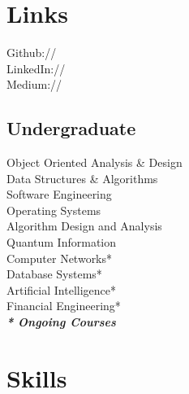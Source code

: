 \documentclass[]{deedy-resume-openfont}
\begin{document}
\begin{minipage}[t]{0.30\textwidth}

\section{Links} 
Github:// \href{https://github.com/anshulahuja98}{} \\
LinkedIn://  \href{https://www.linkedin.com/in/anshul-ahuja}{} \\
Medium://  \href{https://medium.com/@anshul.ahu/}{} \\
\href{https://scholar.google.com/citations?hl=en&user=jPd1-ygAAAAJ}{}

\sectionsep


\subsection{Undergraduate}
Object Oriented Analysis \& Design  \\
Data Structures \& Algorithms  \\
Software Engineering  \\
Operating Systems \\
Algorithm Design and Analysis \\
Quantum Information \\
Computer Networks* \\
Database Systems* \\
Artificial Intelligence* \\
Financial Engineering* \\

{\footnotesize \textit{\textbf{* Ongoing Courses}}}
\sectionsep


\section{Skills}

\end{minipage}
\end{document}
